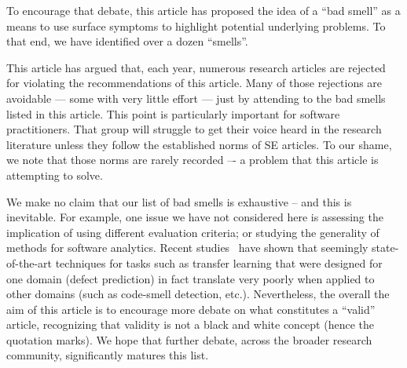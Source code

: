 \documentclass[10pt]{elsarticle}
\begin{document}
To encourage that debate, this article has proposed the idea of a ``bad smell'' as a means to use surface symptoms to highlight potential underlying problems.  To that end, we have identified over
a dozen ``smells''.

This article has argued that, each year, numerous research articles are rejected for violating the recommendations of this article. Many of those rejections are avoidable --- some with very little effort --- just by attending to the bad smells listed in this article.  This point is particularly important
for software practitioners.  That group will struggle to get their voice heard in the research literature unless they follow the established norms of SE articles.  To our shame, we note that those norms are rarely recorded –- a problem that this article is attempting to solve.

We make no claim that our  list of bad smells is exhaustive --  and this is inevitable. For example, one issue we have not considered here is assessing the implication of using different evaluation criteria; or studying the generality of methods for software analytics.  Recent studies~\cite{krishna18a} have shown that seemingly state-of-the-art techniques for tasks such as transfer learning that were designed for one domain (defect prediction) in fact translate very poorly when applied to other domains (such as code-smell detection, etc.).
Nevertheless, the overall the aim of this article is to encourage more debate on what constitutes a ``valid'' article, recognizing that validity is not a black and white concept (hence the quotation marks).  We hope that further debate, across the broader research community, significantly matures this list.
\end{document}

